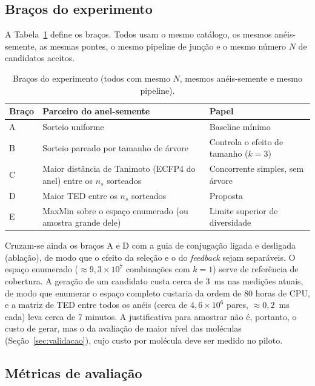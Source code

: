 \subsection{Braços do experimento}

A Tabela~\ref{tab:bracos} define os braços. Todos usam o mesmo catálogo, os mesmos anéis-semente, as mesmas pontes, o mesmo pipeline de junção e o mesmo número $N$ de candidatos aceitos.

\begin{table}[htb]
	\centering
	\caption{Braços do experimento (todos com mesmo $N$, mesmos anéis-semente e mesmo pipeline).}
	\label{tab:bracos}
	\footnotesize
	\begin{tabular}{p{1.2cm}p{5.6cm}p{7.6cm}}
		\hline
		\textbf{Braço} & \textbf{Parceiro do anel-semente} & \textbf{Papel} \\
		\hline
		A & Sorteio uniforme & Baseline mínimo \\
		B & Sorteio pareado por tamanho de árvore & Controla o efeito de tamanho ($k=3$) \\
		C & Maior distância de Tanimoto (ECFP4 do anel) entre os $n_s$ sorteados & Concorrente simples, sem árvore \\
		D & Maior TED entre os $n_s$ sorteados & Proposta \\
		E & MaxMin sobre o espaço enumerado (ou amostra grande dele) & Limite superior de diversidade \\
		\hline
	\end{tabular}
\end{table}

Cruzam-se ainda os braços A e D com a guia de conjugação ligada e desligada (ablação), de modo que o efeito da seleção e o do \textit{feedback} sejam separáveis. O espaço enumerado ($\approx 9{,}3\times10^{7}$ combinações com $k=1$) serve de referência de cobertura. A geração de um candidato custa cerca de $3$~ms nas medições atuais, de modo que enumerar o espaço completo custaria da ordem de $80$ horas de CPU, e a matriz de TED entre todos os anéis (cerca de $4{,}6\times10^{6}$ pares, $\approx 0{,}2$~ms cada) leva cerca de 7 minutos. A justificativa para amostrar não é, portanto, o custo de gerar, mas o da avaliação de maior nível das moléculas (Seção~\ref{sec:validacao}), cujo custo por molécula deve ser medido no piloto.

\subsection{Métricas de avaliação}

